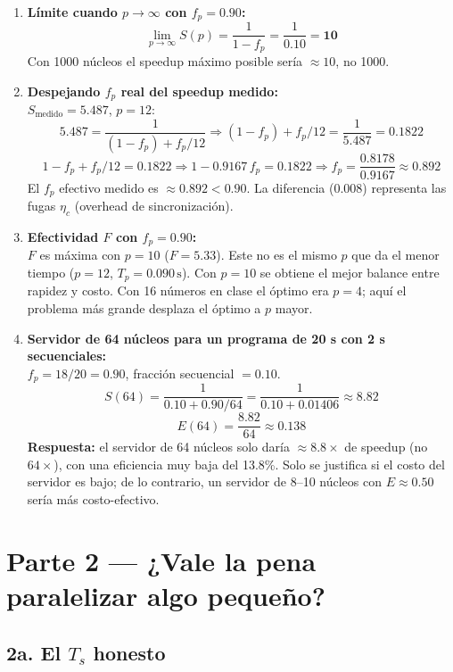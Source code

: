 \documentclass[12pt,letterpaper]{article}
\begin{document}
\begin{enumerate}
\item \textbf{Límite cuando $p \to \infty$ con $f_p = 0.90$:}\\
\[
\lim_{p\to\infty} S(p) = \frac{1}{1 - f_p} = \frac{1}{0.10} = \mathbf{10}
\]
Con 1000 núcleos el speedup máximo posible sería $\approx 10$, no 1000.

\item \textbf{Despejando $f_p$ real del speedup medido:}\\
$S_{\text{medido}} = 5.487$, $p = 12$:
\[
5.487 = \frac{1}{(1-f_p) + f_p/12} \Rightarrow (1-f_p) + f_p/12 = \frac{1}{5.487} = 0.1822
\]
\[
1 - f_p + f_p/12 = 0.1822 \Rightarrow 1 - 0.9167\,f_p = 0.1822 \Rightarrow f_p = \frac{0.8178}{0.9167} \approx 0.892
\]
El $f_p$ efectivo medido es $\approx 0.892 < 0.90$. La diferencia ($0.008$) representa las fugas $\eta_c$ (overhead de sincronización).

\item \textbf{Efectividad $F$ con $f_p = 0.90$:}\\
$F$ es máxima con $p = 10$ ($F = 5.33$). Este no es el mismo $p$ que da el menor tiempo ($p = 12$, $T_p = 0.090\,\text{s}$). Con $p = 10$ se obtiene el mejor balance entre rapidez y costo. Con 16 números en clase el óptimo era $p = 4$; aquí el problema más grande desplaza el óptimo a $p$ mayor.

\item \textbf{Servidor de 64 núcleos para un programa de 20 s con 2 s secuenciales:}\\
$f_p = 18/20 = 0.90$, fracción secuencial $= 0.10$.
\[
S(64) = \frac{1}{0.10 + 0.90/64} = \frac{1}{0.10 + 0.01406} \approx 8.82
\]
\[
E(64) = \frac{8.82}{64} \approx 0.138
\]
\textbf{Respuesta:} el servidor de 64 núcleos solo daría $\approx8.8\times$ de speedup (no $64\times$), con una eficiencia muy baja del 13.8\%. Solo se justifica si el costo del servidor es bajo; de lo contrario, un servidor de 8–10 núcleos con $E \approx 0.50$ sería más costo-efectivo.

\end{enumerate}

\section{Parte 2 — ¿Vale la pena paralelizar algo pequeño?}

\subsection{2a. El $T_s$ honesto}
\end{document}
